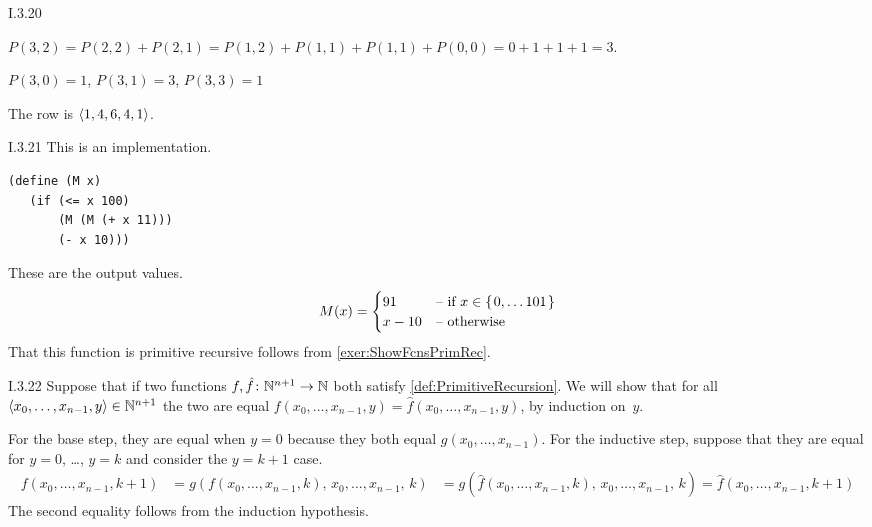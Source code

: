 %
\begin{ans}{I.3.20}
\begin{exparts}
\item $P(3,2)=P(2,2)+P(2,1)=P(1,2)+P(1,1)+P(1,1)+P(0,0)=0+1+1+1=3$.
\item $P(3,0)=1$, $P(3,1)=3$, $P(3,3)=1$
\item The row is $\langle1,4,6,4,1\rangle$.
\end{exparts}
\end{ans}
%
\begin{ans}{I.3.21}
This is an implementation.
\begin{lstlisting}
(define (M x)
   (if (<= x 100)
       (M (M (+ x 11)))
       (- x 10)))
\end{lstlisting}
These are the output values.
\begin{equation*}
  M(x)=
  \begin{cases}
    91  &\case{if $x\in\set{0, \ldots 101}$}  \\
    x-10  &\case{otherwise}
  \end{cases}
\end{equation*}
That this function is primitive recursive follows from
\cref{exer:ShowFcnsPrimRec}.
\end{ans}
%
\begin{ans}{I.3.22}
\autocite{Davis}
Suppose that if two functions $\mbox{$f,\hat{f}\colon \mathbb{N}^{n+1}\to \mathbb{N}$}$ both
satisfy \cref{def:PrimitiveRecursion}.
We will show that for all $\langle x_0,\ldots,x_{n-1},y\rangle\in\mathbb{N}^{n+1}$
the two are equal $f(x_0,\ldots,x_{n-1},y)=\hat{f}(x_0,\ldots,x_{n-1},y)$,
by induction on~$y$.

For the base step,
they are equal when $y=0$ because they both equal $g(x_0,\ldots,x_{n-1})$.
For the inductive step,
suppose that they are equal for $y=0$, \ldots, $y=k$ and consider
the $y=k+1$ case.
\begin{align*}
  f(x_0,\ldots,x_{n-1},k+1)
  &=g(f(x_0,\ldots,x_{n-1},k),\,x_0,\ldots,x_{n-1},\,k)
  &=g(\hat{f}(x_0,\ldots,x_{n-1},k),\,x_0,\ldots,x_{n-1},\,k)
   =\hat{f}(x_0,\ldots,x_{n-1},k+1)
\end{align*}
The second equality follows from the induction hypothesis.
\end{ans}
%
